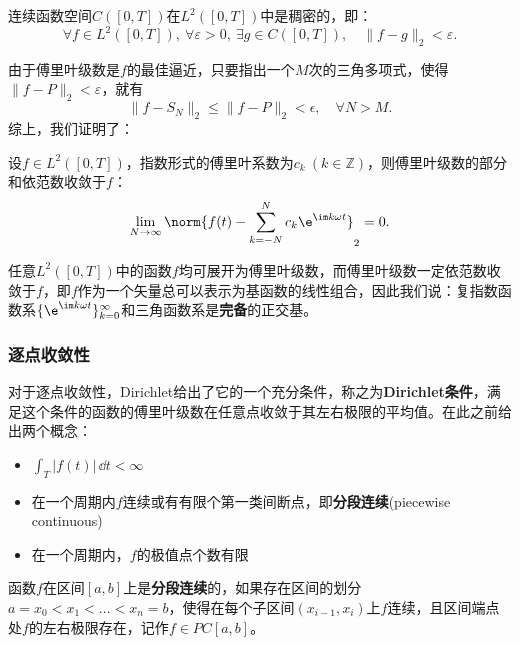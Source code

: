 \begin{claim}
    连续函数空间$C([0,T])$在$L^2([0,T])$中是稠密的，即：
    \begin{equation}
        \forall f\in L^2([0,T]),\ \forall\varepsilon >0,\ \exists g\in C([0,T]),\quad \|f-g\|_2<\varepsilon.
    \end{equation}
\end{claim}

由于傅里叶级数是$f$的最佳逼近，只要指出一个$M$次的三角多项式，使得$\|f-P\|_2<\varepsilon$，就有
\begin{equation}
    \|f-S_N\|_2 \leq \|f-P\|_2<\epsilon,\quad \forall N>M.
\end{equation}
综上，我们证明了：
\begin{theorem}[傅里叶级数的依范数收敛性]
    设$f\in L^2([0,T])$，指数形式的傅里叶系数为$c_k\ (k\in\mathbb{Z})$，则傅里叶级数的部分和依范数收敛于$f$：
    \begin{equation}
        \lim_{N \to \infty} \norm{f(t)-\sum_{k=-N}^{N}c_k \e^{\im k\omega t}}_2=0.
    \end{equation}
\end{theorem}

任意$L^2([0,T])$中的函数$f$均可展开为傅里叶级数，而傅里叶级数一定依范数收敛于$f$，即$f$作为一个矢量总可以表示为基函数的线性组合，因此我们说：复指数函数系$\{\e^{\im k\omega t}\}_{k=0}^{\infty}$和三角函数系是\textbf{完备}的正交基。

\subsubsection{逐点收敛性}

对于逐点收敛性，Dirichlet给出了它的一个充分条件，称之为\textbf{Dirichlet条件}，满足这个条件的函数的傅里叶级数在任意点收敛于其左右极限的平均值。在此之前给出两个概念：

\begin{definition}[Dirichlet条件]
    \begin{itemize}[nosep, left=0pt]
        \item $\int_{T}|f(t)|\,\dd t<\infty$
        \item 在一个周期内$f$连续或有有限个第一类间断点，即\textbf{分段连续}(piecewise continuous)
        \item 在一个周期内，$f$的极值点个数有限
    \end{itemize}
\end{definition}
\begin{definition}[分段连续]
    \label{def:piecewise_continuos}
    函数$f$在区间$[a,b]$上是\textbf{分段连续}的，如果存在区间的划分$a=x_0<x_1<\dots <x_n=b$，使得在每个子区间$(x_{i-1},x_i)$上$f$连续，且区间端点处$f$的左右极限存在，记作$f\in PC[a,b]$。
\end{definition}

